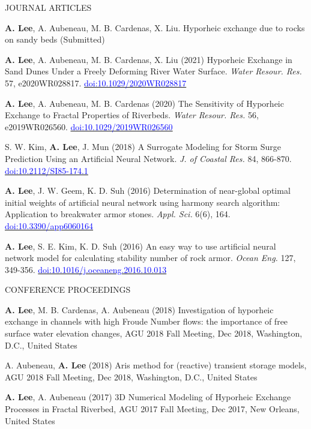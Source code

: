 \documentclass{resume_anzy} %
\begin{document}
\begin{rSection}{JOURNAL ARTICLES}
\vspace{-2.5mm}
\item \textbf{A. Lee}, A. Aubeneau, M. B. Cardenas, X. Liu. Hyporheic exchange due to rocks on sandy beds (Submitted)
\item \textbf{A. Lee}, A. Aubeneau, M. B. Cardenas, X. Liu (2021) Hyporheic Exchange in Sand Dunes Under a Freely Deforming River Water Surface. \textit{Water Resour. Res.} 57, e2020WR028817. \href{https://doi.org/10.1029/2020WR028817}{\textcolor{blue}{doi:10.1029/2020WR028817}}
\item \textbf{A. Lee}, A. Aubeneau, M. B. Cardenas (2020) The Sensitivity of Hyporheic Exchange to Fractal Properties of Riverbeds. \textit{Water Resour. Res.} 56, e2019WR026560. \href{https://doi.org/10.1029/2019WR026560}{\textcolor{blue}{doi:10.1029/2019WR026560}}
\item S. W. Kim, \textbf{A. Lee}, J. Mun (2018) A Surrogate Modeling for Storm Surge Prediction Using an Artificial Neural Network. \textit{J. of Coastal Res.} 84, 866-870. \href{https://doi.org/10.2112/SI85-174.1}{\textcolor{blue}{doi:10.2112/SI85-174.1}}
\item \textbf{A. Lee}, J. W. Geem, K. D. Suh (2016) Determination of near-global optimal initial weights of artificial neural network using harmony search algorithm: Application to breakwater armor stones. \textit{Appl. Sci.} 6(6), 164. \href{https://doi.org/10.3390/app6060164}{\textcolor{blue}{doi:10.3390/app6060164}}
\item \textbf{A. Lee}, S. E. Kim, K. D. Suh (2016) An easy way to use artificial neural network model for calculating stability number of rock armor. \textit{Ocean Eng.} 127, 349-356.  \href{https://doi.org/10.1016/j.oceaneng.2016.10.013}{\textcolor{blue}{doi:10.1016/j.oceaneng.2016.10.013}}
\end{rSection}

\begin{rSection}{CONFERENCE PROCEEDINGS}
\vspace{-2.5mm}
\item \textbf{A. Lee}, M. B. Cardenas, A. Aubeneau (2018) Investigation of hyporheic exchange in channels with high Froude Number flows: the importance of free surface water elevation changes, AGU 2018 Fall Meeting, Dec 2018, Washington, D.C., United States 
\item A. Aubeneau, \textbf{A. Lee}  (2018) Aris method for (reactive) transient storage models, AGU 2018 Fall Meeting, Dec 2018, Washington, D.C., United States 
\item \textbf{A. Lee}, A. Aubeneau (2017) 3D Numerical Modeling of Hyporheic Exchange Processes in Fractal Riverbed, AGU 2017 Fall Meeting, Dec 2017, New Orleans, United States 
\end{rSection}
\end{document}
